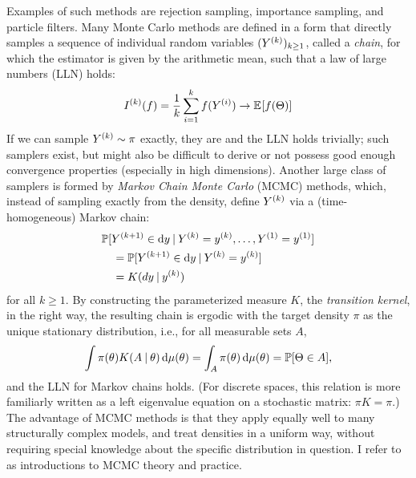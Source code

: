 Examples of such methods are rejection sampling, importance sampling, and particle filters.  Many
Monte Carlo methods are defined in a form that directly samples a sequence of individual random
variables \((Y^{(k)})_{k \ge 1}\), called a \emph{chain}, for which the estimator is given by the
arithmetic mean, such that a law of large numbers (LLN) holds:
\begin{equation}
  \label{eq:mc-lln}
  \kth{I}(f) = \frac{1}{k} \sum_{i=1}^{k} f(\kth[i]{Y}) \to \Exp{f(\Theta)}
\end{equation}
If we can sample \(Y^{(k)} \sim \pi\) exactly, they are \iid{} and the LLN holds trivially; such
samplers exist, but might also be difficult to derive or not possess good enough convergence
properties (especially in high dimensions).  Another large class of samplers is formed by
\emph{Markov Chain Monte Carlo} (MCMC) methods, which, instead of sampling exactly from the density,
define \(Y^{(k)}\) via a (time-homogeneous) Markov chain:
\begin{equation}
  \label{eq:mc-kernel}
  \begin{aligned}
    &\Prob{\kth[k+1]{Y} \in \dif y
      \given \kth{Y} = \kth{y}, \ldots, \kth[1]{Y} = \kth[1]{y}} \\
    &\quad = \Prob{\kth[k+1]{Y} \in \dif y \given \kth{Y} = \kth{y}}  \\
    &\quad = K(dy \given \kth{y}) \\
  \end{aligned}
\end{equation}
for all \(k \ge 1\).  By constructing the parameterized measure \(K\), the \emph{transition kernel},
in the right way, the resulting chain is ergodic with the target density \(\pi\) as the unique
stationary distribution, i.e., for all measurable sets \(A\),
\begin{equation}
  \label{eq:stationarity}
  \int \pi(\theta) K(A \given \theta) \dif\mu(\theta) = \int_A \pi(\theta) \dif\mu(\theta) =
  \Prob{\Theta \in A},
\end{equation}
and the LLN for Markov chains holds.  (For discrete spaces, this relation is more familiarly written
as a left eigenvalue equation on a stochastic matrix: \(\pi K = \pi\).)  The advantage of MCMC
methods is that they apply equally well to many structurally complex models, and treat densities in
a uniform way, without requiring special knowledge about the specific distribution in question.  I
refer to \textcites[chapter 6]{vihola2020lectures}{robert1999monte}[chapters 24 and
following]{murphy2012machine} as introductions to MCMC theory and practice.

